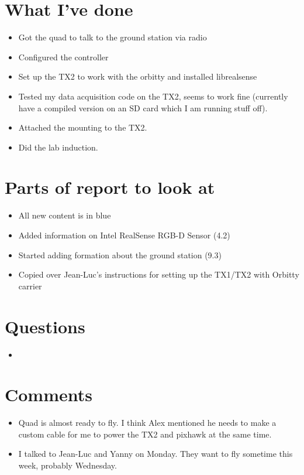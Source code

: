 \documentclass[12pt,a4paper]{article}
\begin{document}
\author{Katrina Ashton}


\pagestyle{fancy}
\fancyhf{}
\rhead{\thepage}

\section{What I've done}
\begin{itemize}
\item{Got the quad to talk to the ground station via radio}
\item{Configured the controller}
\item{Set up the TX2 to work with the orbitty and installed librealsense}
\item{Tested my data acquisition code on the TX2, seems to work fine (currently have a compiled version on an SD card which I am running stuff off).}
\item{Attached the mounting to the TX2.}
\item{Did the lab induction.}
\end{itemize}

\section{Parts of report to look at}
\begin{itemize}
\item{All new content is in blue}
\item{Added information on Intel RealSense RGB-D Sensor (4.2)}
\item{Started adding formation about the ground station (9.3)}
\item{Copied over Jean-Luc's instructions for setting up the TX1/TX2 with Orbitty carrier}
\end{itemize}

\section{Questions}
\begin{itemize}
\item{}
\end{itemize}

\section{Comments}
\begin{itemize}
\item{Quad is almost ready to fly. I think Alex mentioned he needs to make a custom cable for me to power the TX2 and pixhawk at the same time.}
\item{I talked to Jean-Luc and Yanny on Monday. They want to fly sometime this week, probably Wednesday.}
\end{itemize}
\end{document}
